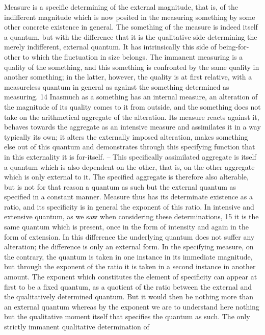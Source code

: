 Measure is a specific determining of the external magnitude, that is, of the
indifferent magnitude which is now posited in the measuring something by
some other concrete existence in general.
The something of the measure is indeed itself a quantum, but
with the difference that it is the qualitative side
determining the merely indifferent, external quantum.
It has intrinsically this side of being-for-other
to which the fluctuation in size belongs.
The immanent measuring is a quality of the something, and this something
is confronted by the same quality in another something; in the latter,
however, the quality is at first relative, with a measureless quantum in
general as against the something determined as measuring. 14
Inasmuch as a something has an internal measure, an alteration of the
magnitude of its quality comes to it from outside, and the something
does not take on the arithmetical aggregate of the alteration. Its measure
reacts against it, behaves towards the aggregate as an intensive measure and
assimilates it in a way typically its own; it alters the externally imposed
alteration, makes something else out of this quantum and demonstrates
through this specifying function that in this externality it is for-itself. – This
specifically assimilated aggregate is itself a quantum which is also dependent
on the other, that is, on the other aggregate which is only external to it.
The specified aggregate is therefore also alterable, but is not for that reason
a quantum as such but the external quantum as specified in a constant
manner. Measure thus has its determinate existence as a ratio, and its
specificity is in general the exponent of this ratio.
In intensive and extensive quantum, as we saw when considering these
determinations, 15 it is the same quantum which is present, once in the
form of intensity and again in the form of extension. In this difference the
underlying quantum does not suffer any alteration; the difference is only
an external form. In the specifying measure, on the contrary, the quantum
is taken in one instance in its immediate magnitude, but through the
exponent of the ratio it is taken in a second instance in another amount.
The exponent which constitutes the element of specificity can appear
at first to be a fixed quantum, as a quotient of the ratio between the
external and the qualitatively determined quantum. But it would then be
nothing more than an external quantum whereas by the exponent we are to
understand here nothing but the qualitative moment itself that specifies the
quantum as such. The only strictly immanent qualitative determination of
